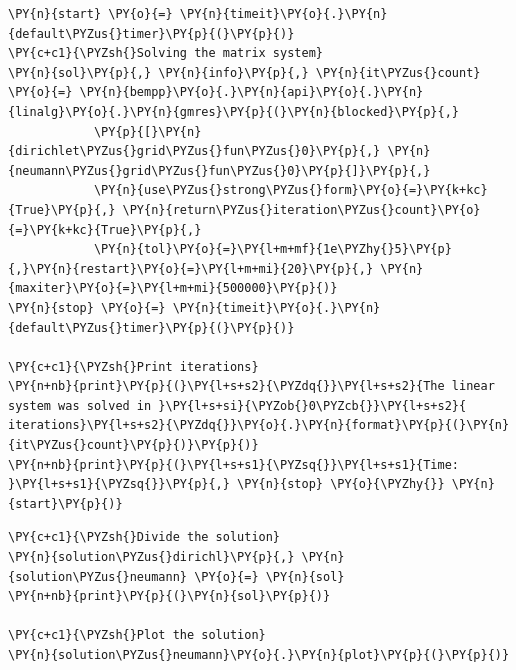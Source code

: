 \begin{tcolorbox}
\begin{Verbatim}[commandchars=\\\{\}]
\PY{n}{start} \PY{o}{=} \PY{n}{timeit}\PY{o}{.}\PY{n}{default\PYZus{}timer}\PY{p}{(}\PY{p}{)}
\PY{c+c1}{\PYZsh{}Solving the matrix system}
\PY{n}{sol}\PY{p}{,} \PY{n}{info}\PY{p}{,} \PY{n}{it\PYZus{}count} \PY{o}{=} \PY{n}{bempp}\PY{o}{.}\PY{n}{api}\PY{o}{.}\PY{n}{linalg}\PY{o}{.}\PY{n}{gmres}\PY{p}{(}\PY{n}{blocked}\PY{p}{,} 
			\PY{p}{[}\PY{n}{dirichlet\PYZus{}grid\PYZus{}fun\PYZus{}0}\PY{p}{,} \PY{n}{neumann\PYZus{}grid\PYZus{}fun\PYZus{}0}\PY{p}{]}\PY{p}{,}
			\PY{n}{use\PYZus{}strong\PYZus{}form}\PY{o}{=}\PY{k+kc}{True}\PY{p}{,} \PY{n}{return\PYZus{}iteration\PYZus{}count}\PY{o}{=}\PY{k+kc}{True}\PY{p}{,} 
			\PY{n}{tol}\PY{o}{=}\PY{l+m+mf}{1e\PYZhy{}5}\PY{p}{,}\PY{n}{restart}\PY{o}{=}\PY{l+m+mi}{20}\PY{p}{,} \PY{n}{maxiter}\PY{o}{=}\PY{l+m+mi}{500000}\PY{p}{)}
\PY{n}{stop} \PY{o}{=} \PY{n}{timeit}\PY{o}{.}\PY{n}{default\PYZus{}timer}\PY{p}{(}\PY{p}{)}

\PY{c+c1}{\PYZsh{}Print iterations}
\PY{n+nb}{print}\PY{p}{(}\PY{l+s+s2}{\PYZdq{}}\PY{l+s+s2}{The linear system was solved in }\PY{l+s+si}{\PYZob{}0\PYZcb{}}\PY{l+s+s2}{ iterations}\PY{l+s+s2}{\PYZdq{}}\PY{o}{.}\PY{n}{format}\PY{p}{(}\PY{n}{it\PYZus{}count}\PY{p}{)}\PY{p}{)}
\PY{n+nb}{print}\PY{p}{(}\PY{l+s+s1}{\PYZsq{}}\PY{l+s+s1}{Time: }\PY{l+s+s1}{\PYZsq{}}\PY{p}{,} \PY{n}{stop} \PY{o}{\PYZhy{}} \PY{n}{start}\PY{p}{)}
\end{Verbatim}
\end{tcolorbox}


\begin{tcolorbox}
\begin{Verbatim}[commandchars=\\\{\}]
\PY{c+c1}{\PYZsh{}Divide the solution}
\PY{n}{solution\PYZus{}dirichl}\PY{p}{,} \PY{n}{solution\PYZus{}neumann} \PY{o}{=} \PY{n}{sol}
\PY{n+nb}{print}\PY{p}{(}\PY{n}{sol}\PY{p}{)}

\PY{c+c1}{\PYZsh{}Plot the solution}
\PY{n}{solution\PYZus{}neumann}\PY{o}{.}\PY{n}{plot}\PY{p}{(}\PY{p}{)}
\end{Verbatim}
\end{tcolorbox}


